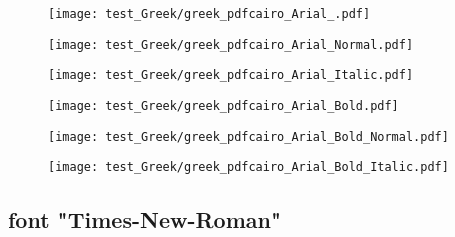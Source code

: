 \documentclass{ltjsarticle}
\begin{document}
			\begin{figure}[ht]
				\centering
				\begin{minipage}{0.3\columnwidth}
					\texttt{[image: test\_Greek/greek\_pdfcairo\_Arial\_.pdf]}
				\end{minipage}
				\begin{minipage}{0.3\columnwidth}
					\texttt{[image: test\_Greek/greek\_pdfcairo\_Arial\_Normal.pdf]}
				\end{minipage}
				\begin{minipage}{0.3\columnwidth}
					\texttt{[image: test\_Greek/greek\_pdfcairo\_Arial\_Italic.pdf]}
				\end{minipage}
				\begin{minipage}{0.3\columnwidth}
					\texttt{[image: test\_Greek/greek\_pdfcairo\_Arial\_Bold.pdf]}
				\end{minipage}
				\begin{minipage}{0.3\columnwidth}
					\texttt{[image: test\_Greek/greek\_pdfcairo\_Arial\_Bold\_Normal.pdf]}
				\end{minipage}
				\begin{minipage}{0.3\columnwidth}
					\texttt{[image: test\_Greek/greek\_pdfcairo\_Arial\_Bold\_Italic.pdf]}
				\end{minipage}
			\end{figure}
			\clearpage%
		
		\subsection{font "Times-New-Roman"}
\end{document}
